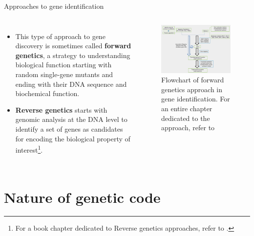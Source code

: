 \documentclass[11pt,dvipsnames,ignorenonframetext,aspectratio=169]{beamer}
\providecommand{\tightlist}{%
  \setlength{\itemsep}{0pt}\setlength{\parskip}{0pt}}
\newcommand{\bcolumns}{\begin{columns}[T, onlytextwidth]}
\newcommand{\ecolumns}{\end{columns}}
\begin{document}
\begin{frame}{Approaches to gene identification}
\protect\hypertarget{approaches-to-gene-identification}{}
\bcolumns
{}

\begin{itemize}
\tightlist
\item
  This type of approach to gene discovery is sometimes called
  \textbf{forward genetics}, a strategy to understanding biological
  function starting with random single-gene mutants and ending with
  their DNA sequence and biochemical function.
\item
  \textbf{Reverse genetics} starts with genomic analysis at the DNA
  level to identify a set of genes as candidates for encoding the
  biological property of
  interest\footnote[frame]{For a book chapter dedicated to Reverse genetics approaches, refer to \cite{gilchrist2013gene}.}.
\end{itemize}


\begin{figure}
\includegraphics[width=0.8\linewidth]{../images/gene_id_forward_genetics} \caption{Flowchart of forward genetics approach in gene identification. For an entire chapter dedicated to the approach, refer to \cite{ji2013gene}}\label{fig:forward-genetics}
\end{figure}

\ecolumns
\end{frame}

\hypertarget{nature-of-genetic-code}{%
\section{Nature of genetic code}\label{nature-of-genetic-code}}
\end{document}

